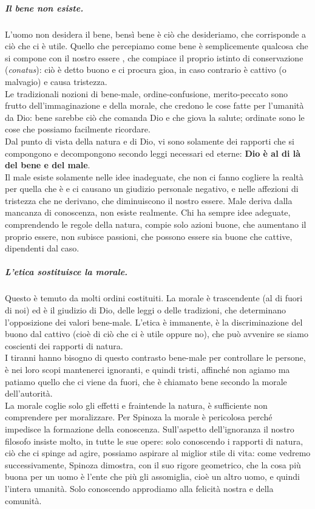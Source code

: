 \subparagraph{Il bene non esiste.} L'uomo non desidera il bene, bensì bene è ciò che desideriamo, che corrisponde a ciò che ci è utile. Quello che percepiamo come bene è semplicemente qualcosa che si compone con il nostro essere , che compiace il proprio istinto di conservazione (\textit{conatus}): ciò è detto buono e ci procura gioa, in caso contrario è cattivo (o malvagio) e causa tristezza.\\
Le tradizionali nozioni di bene-male, ordine-confusione, merito-peccato sono frutto dell'immaginazione e della morale, che credono le cose fatte per l'umanità da Dio: bene sarebbe ciò che comanda Dio e che giova la salute; ordinate sono le cose che possiamo facilmente ricordare.\\
Dal punto di vista della natura e di Dio, vi sono solamente dei rapporti che si compongono e decompongono secondo leggi necessari ed eterne: \textbf{Dio è al di là del bene e del male}.\\
Il male esiste solamente nelle idee inadeguate, che non ci fanno cogliere la realtà per quella che è e ci causano un giudizio personale negativo, e nelle affezioni di tristezza che ne derivano, che diminuiscono il nostro essere. Male deriva dalla mancanza di conoscenza, non esiste realmente. Chi ha sempre idee adeguate, comprendendo le regole della natura, compie solo azioni buone, che aumentano il proprio essere, non subisce passioni, che possono essere sia buone che cattive, dipendenti dal caso.
\subparagraph{L'etica sostituisce la morale.} Questo è  temuto da molti ordini costituiti. La morale è trascendente (al di fuori di noi) ed è il giudizio di Dio, delle leggi  o delle tradizioni, che determinano l'opposizione dei valori bene-male. L'etica è immanente, è la discriminazione del buono dal cattivo (cioè di ciò che ci è utile oppure no), che può avvenire se siamo coscienti dei rapporti di natura.\\ I tiranni hanno bisogno di questo contrasto bene-male per controllare le persone, è nei loro scopi mantenerci ignoranti, e quindi tristi, affinché non agiamo ma patiamo quello che ci viene da fuori, che è chiamato bene secondo la morale dell'autorità.\\
La morale coglie solo gli effetti e fraintende la natura, è sufficiente non comprendere per moralizzare. Per Spinoza la morale è pericolosa perché impedisce la formazione della conoscenza. Sull'aspetto dell'ignoranza il nostro filosofo insiste molto, in tutte le sue opere: solo conoscendo i rapporti di natura, ciò che ci spinge ad agire, possiamo aspirare al miglior stile di vita: come vedremo successivamente, Spinoza dimostra, con il suo rigore geometrico, che la cosa più buona per un uomo è l'ente che più gli assomiglia, cioè un altro uomo, e quindi l'intera umanità. Solo conoscendo approdiamo alla felicità nostra e della comunità.
